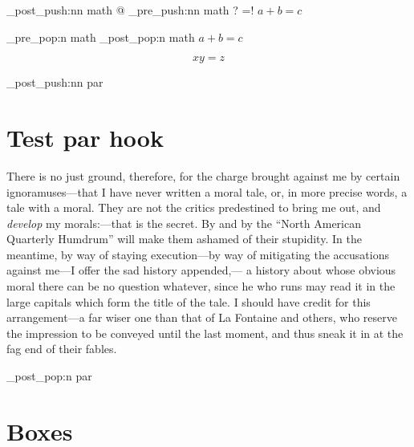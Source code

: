 \documentclass{article}
\begin{document}
\ExplSyntaxOn
\hook_post_push:nn {math} {@}
\hook_pre_push:nn {math} {?}
\everymath={!}
$a+b=c$\par

\hook_pre_pop:n {math}
\hook_post_pop:n {math}
$a+b=c$
\ExplSyntaxOff

\[xy=z\]

\ExplSyntaxOn
\hook_post_push:nn {par} {\makebox[0pt][r]{\P\space}}
\ExplSyntaxOff

\section{Test par hook}
There is no just ground, therefore, for the charge brought against me by
certain ignoramuses---that I have never written a moral tale, or, in more
precise words, a tale with a moral. They are not the critics predestined
to bring me out, and \emph{develop} my morals:---that is the secret. By and by
the ``North American Quarterly Humdrum'' will make them ashamed of their
stupidity. In the meantime, by way of staying execution---by way of
mitigating the accusations against me---I offer the sad history appended,---
a history about whose obvious moral there can be no question whatever,
since he who runs may read it in the large capitals which form the title
of the tale. I should have credit for this arrangement---a far wiser one
than that of La Fontaine and others, who reserve the impression to be
conveyed until the last moment, and thus sneak it in at the fag end of
their fables.

\ExplSyntaxOn
\hook_post_pop:n {par}
\ExplSyntaxOff

\section{Boxes}

\par
\begingroup
\ExplSyntaxOn
{}
\ExplSyntaxOff
\endgroup
\end{document}
